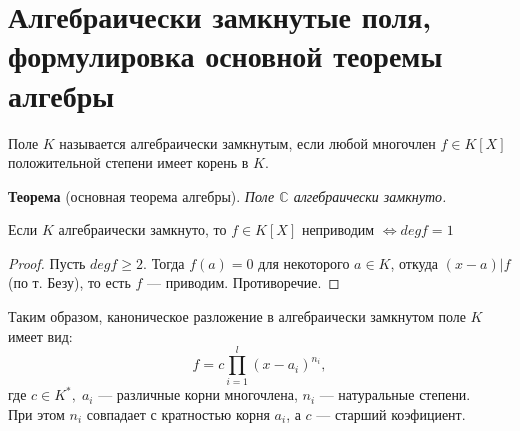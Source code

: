 \section{Алгебраически замкнутые поля, формулировка основной теоремы алгебры}

\begin{conj}
    Поле $K$ называется алгебраически замкнутым, если любой многочлен $f \in K[X]$
    положительной степени имеет корень в $K$.
\end{conj}

\textbf{Теорема} (основная теорема алгебры). 
\textit{Поле $\mathbb{C}$ алгебраически замкнуто.}

\vspace{5mm}

\begin{theorem-non}
    Если $K$ алгебраически замкнуто, то $f \in K[X]$ неприводим $\Longleftrightarrow deg f = 1$
    \begin{proof}
        Пусть $deg f \geqslant 2.$ Тогда $f(a) = 0$ для некоторого $a \in K$, откуда $(x - a) | f$ (по т. Безу),
        то есть $f$ --- приводим. Противоречие.
    \end{proof}
\end{theorem-non}

Таким образом, каноническое разложение в алгебраически замкнутом поле $K$ имеет вид: 
\[ f = c \prod_{i = 1}^{l} (x - a_i)^{n_i}, \]
 где $c \in K^*,\; a_i$ --- различные корни многочлена,
$n_i$ --- натуральные степени. \\
При этом $n_i$ совпадает с кратностью корня $a_i$, а $c$ --- старший коэфициент.
